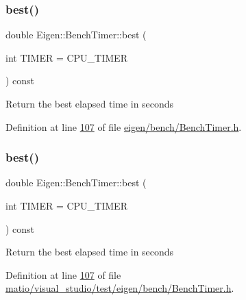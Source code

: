 \subsubsection{\texorpdfstring{best()}{best()}\hspace{0.1cm}{\footnotesize\ttfamily [1/2]}}
{\footnotesize\ttfamily double Eigen\+::\+Bench\+Timer\+::best (\begin{DoxyParamCaption}\item[{int}]{T\+I\+M\+ER = {\ttfamily CPU\+\_\+TIMER} }\end{DoxyParamCaption}) const\hspace{0.3cm}{\ttfamily [inline]}}

Return the best elapsed time in seconds 

Definition at line \hyperlink{eigen_2bench_2_bench_timer_8h_source_l00107}{107} of file \hyperlink{eigen_2bench_2_bench_timer_8h_source}{eigen/bench/\+Bench\+Timer.\+h}.

\mbox{\label{class_eigen_1_1_bench_timer_ae8b673b0fa356d3432c7a65c79e8af0e}} 
\subsubsection{\texorpdfstring{best()}{best()}\hspace{0.1cm}{\footnotesize\ttfamily [2/2]}}
{\footnotesize\ttfamily double Eigen\+::\+Bench\+Timer\+::best (\begin{DoxyParamCaption}\item[{int}]{T\+I\+M\+ER = {\ttfamily CPU\+\_\+TIMER} }\end{DoxyParamCaption}) const\hspace{0.3cm}{\ttfamily [inline]}}

Return the best elapsed time in seconds 

Definition at line \hyperlink{matio_2visual__studio_2test_2eigen_2bench_2_bench_timer_8h_source_l00107}{107} of file \hyperlink{matio_2visual__studio_2test_2eigen_2bench_2_bench_timer_8h_source}{matio/visual\+\_\+studio/test/eigen/bench/\+Bench\+Timer.\+h}.

\mbox{\label{class_eigen_1_1_bench_timer_af341aa613dba2d4a3d167093197e4e7a}} 
